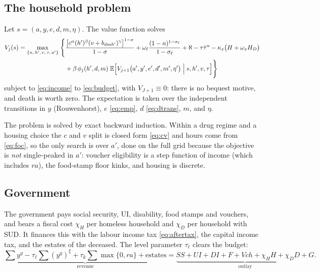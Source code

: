 \documentclass[11pt]{article}
\begin{document}
\subsection{The household problem}

Let $s=(a,y,e,d,m,\eta)$. The value function solves
\begin{equation}
\begin{aligned}
V_j(s)=\max_{\{n,\,h',\,v,\,\tau,\,a'\}}\;\Biggl\{&
\frac{\bigl[c^{\alpha}(h')^{\beta}(v+b_{dmh'})^{\gamma}\bigr]^{1-\sigma}}{1-\sigma}
+\omega_{\ell}\frac{(1-n)^{1-\sigma_{\ell}}}{1-\sigma_{\ell}}
+\aleph-\tau\bar\tau^{u}-\kappa_x\bigl(H+\omega_x H_D\bigr)\\
&+\beta\,\phi_j(h',d,m)\;
\mathbb E\Bigl[V_{j+1}\bigl(a',y',e',d',m',\eta'\bigr)\;\Big|\;s,h',v,\tau\Bigr]\Biggr\}
\end{aligned}
\label{eq:bellman}
\end{equation}
subject to \eqref{eq:income} to \eqref{eq:budget}, with $V_{J+1}\equiv0$: there is
no bequest motive, and death is worth zero. The expectation is taken over the
independent transitions in $y$ (Rouwenhorst), $e$ \eqref{eq:emp}, $d$
\eqref{eq:dtrans}, $m$, and $\eta$.

The problem is solved by exact backward induction. Within a drug regime and a
housing choice the $c$ and $v$ split is closed form \eqref{eq:cv} and hours come
from \eqref{eq:foc}, so the only search is over $a'$, done on the full grid
because the objective is \emph{not} single-peaked in $a'$: voucher eligibility is
a step function of income (which includes $ra$), the food-stamp floor kinks, and
housing is discrete.

\subsection{Government}
\label{sec:govt}

The government pays social security, UI, disability, food stamps and vouchers,
and bears a fiscal cost $\chi_H$ per homeless household and $\chi_D$ per
household with SUD. It finances this with the labour income tax
\eqref{eq:aftertax}, the capital income tax, and the estates of the deceased.
The level parameter $\tau_{\ell}$ clears the budget:
\begin{equation}
\underbrace{\sum y^{g}-\tau_{\ell}\sum (y^{g})^{\xi}+\tau_k\sum \max\{0,ra\}+\text{estates}}_{\text{revenue}}
=\underbrace{SS+UI+DI+F+V\!ch+\chi_H H+\chi_D D+G}_{\text{outlay}} .
\label{eq:govt}
\end{equation}
\end{document}
